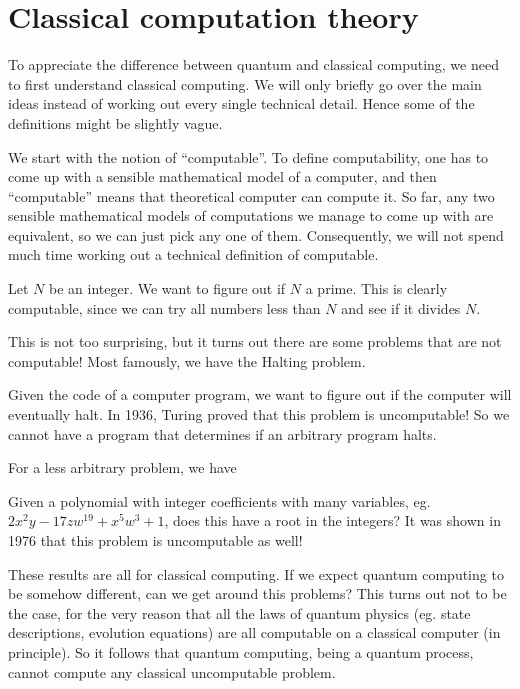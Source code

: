 \documentclass[a4paper]{article}
\begin{document}
\section{Classical computation theory}
To appreciate the difference between quantum and classical computing, we need to first understand classical computing. We will only briefly go over the main ideas instead of working out every single technical detail. Hence some of the definitions might be slightly vague.

We start with the notion of ``computable''. To define computability, one has to come up with a sensible mathematical model of a computer, and then ``computable'' means that theoretical computer can compute it. So far, any two sensible mathematical models of computations we manage to come up with are equivalent, so we can just pick any one of them. Consequently, we will not spend much time working out a technical definition of computable.

\begin{eg}
  Let $N$ be an integer. We want to figure out if $N$ a prime. This is clearly computable, since we can try all numbers less than $N$ and see if it divides $N$.
\end{eg}

This is not too surprising, but it turns out there are some problems that are not computable! Most famously, we have the Halting problem.
\begin{eg}
  Given the code of a computer program, we want to figure out if the computer will eventually halt. In 1936, Turing proved that this problem is uncomputable! So we cannot have a program that determines if an arbitrary program halts.
\end{eg}

For a less arbitrary problem, we have
\begin{eg}
  Given a polynomial with integer coefficients with many variables, eg. $2x^2 y - 17 zw^{19} + x^5 w^3 + 1$, does this have a root in the integers? It was shown in 1976 that this problem is uncomputable as well!
\end{eg}

These results are all for classical computing. If we expect quantum computing to be somehow different, can we get around this problems? This turns out not to be the case, for the very reason that all the laws of quantum physics (eg. state descriptions, evolution equations) are all computable on a classical computer (in principle). So it follows that quantum computing, being a quantum process, cannot compute any classical uncomputable problem.
\end{document}
